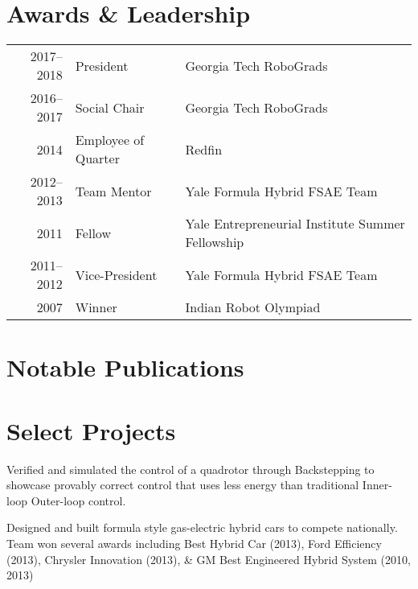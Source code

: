 \documentclass[]{deedy-resume}
\begin{document}
\begin{minipage}[t]{0.66\textwidth}

\section{Awards \& Leadership}
\begin{tabular}{rll}
2017--2018 & President & Georgia Tech RoboGrads \\
2016--2017 & Social Chair & Georgia Tech RoboGrads \\
2014 & Employee of Quarter & Redfin \\
2012--2013 & Team Mentor & Yale Formula Hybrid FSAE Team \\
2011 & Fellow & Yale Entrepreneurial Institute Summer Fellowship \\
2011--2012 & Vice-President & Yale Formula Hybrid FSAE Team \\
2007 & Winner & Indian Robot Olympiad
\end{tabular}
\sectionsep


\section{Notable Publications}
\renewcommand\refname{\vskip -0.8cm} %


\nocite{*}


\section{Select Projects}
Verified and simulated the control of a quadrotor through Backstepping to showcase provably correct control that uses less energy than traditional Inner-loop Outer-loop control.
\sectionsep

Designed and built formula style gas-electric hybrid cars to compete nationally. Team won several awards including Best Hybrid Car (2013), Ford Efficiency (2013), Chrysler Innovation (2013), \& GM Best Engineered Hybrid System (2010, 2013)
\sectionsep

\end{minipage}
\end{document}
